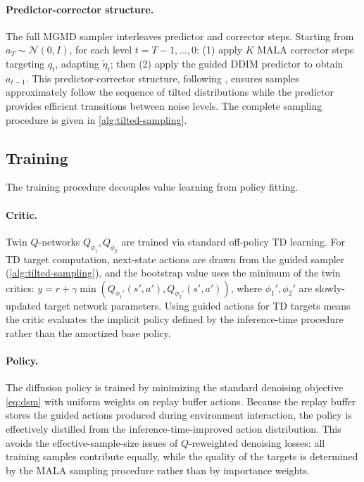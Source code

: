 \documentclass{article}
\theoremstyle{plain}
\theoremstyle{definition}
\theoremstyle{remark}
\begin{document}
\paragraph{Predictor-corrector structure.}
The full MGMD sampler interleaves predictor and corrector steps.
Starting from $a_T \sim \mathcal{N}(0, I)$, for each level $t = T{-}1, \ldots, 0$: (1) apply $K$ MALA corrector steps targeting $q_t$, adapting $\tilde{\eta}_t$; then (2) apply the guided DDIM predictor to obtain $a_{t-1}$.
This predictor-corrector structure, following \citet{du2023reduce_reuse_recycle}, ensures samples approximately follow the sequence of tilted distributions while the predictor provides efficient transitions between noise levels.
The complete sampling procedure is given in \cref{alg:tilted-sampling}.

\subsection{Training}
\label{sec:training}

The training procedure decouples value learning from policy fitting.

\paragraph{Critic.}
Twin $Q$-networks $Q_{\phi_1}, Q_{\phi_2}$ are trained via standard off-policy TD learning.
For TD target computation, next-state actions are drawn from the guided sampler (\cref{alg:tilted-sampling}), and the bootstrap value uses the minimum of the twin critics: $y = r + \gamma \min(Q_{\phi_1'}(s', a'), Q_{\phi_2'}(s', a'))$, where $\phi_1', \phi_2'$ are slowly-updated target network parameters.
Using guided actions for TD targets means the critic evaluates the implicit policy defined by the inference-time procedure rather than the amortized base policy.

\paragraph{Policy.}
The diffusion policy is trained by minimizing the standard denoising objective \cref{eq:dsm} with uniform weights on replay buffer actions.
Because the replay buffer stores the guided actions produced during environment interaction, the policy is effectively distilled from the inference-time-improved action distribution.
This avoids the effective-sample-size issues of $Q$-reweighted denoising losses: all training samples contribute equally, while the quality of the targets is determined by the MALA sampling procedure rather than by importance weights.
\end{document}
